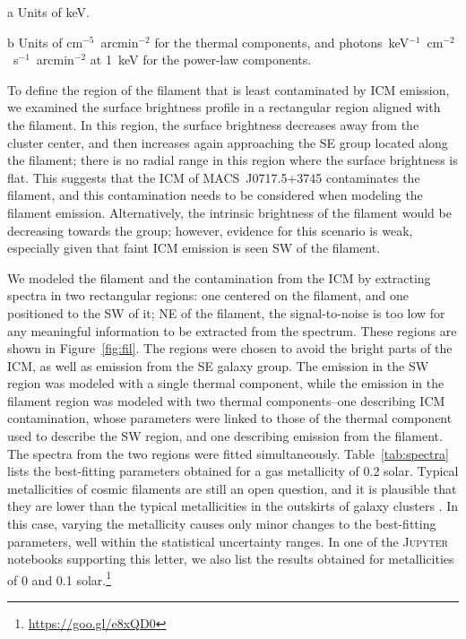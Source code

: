 \begin{table}
\begin{center}
\begin{threeparttable}
\begin{tabular}{l c c}
      \end{tabular}
      \begin{tablenotes}
              \item[a] Units of keV.
              \item[b] Units of cm$^{-5}$~arcmin$^{-2}$ for the thermal components, and photons~keV$^{-1}$~cm$^{-2}$~s$^{-1}$~arcmin$^{-2}$ at 1~keV for the power-law components.
      \end{tablenotes}
    \end{threeparttable}
  \end{center}
\end{table}

To define the region of the filament that is least contaminated by ICM emission, we examined the surface brightness profile in a rectangular region aligned with the filament. In this region, the surface brightness decreases away from the cluster center, and then increases again approaching the SE group located along the filament; there is no radial range in this region where the surface brightness is flat. This suggests that the ICM of MACS~J0717.5+3745 contaminates the filament, and this contamination needs to be considered when modeling the filament emission. Alternatively, the intrinsic brightness of the filament would be decreasing towards the group; however, evidence for this scenario is weak, especially given that faint ICM emission is seen SW of the filament.

We modeled the filament and the contamination from the ICM by extracting spectra in two rectangular regions: one centered on the filament, and one positioned to the SW of it; NE of the filament, the signal-to-noise is too low for any meaningful information to be extracted from the spectrum. These regions are shown in Figure~\ref{fig:fil}. The regions were chosen to avoid the bright parts of the ICM, as well as emission from the SE galaxy group. The emission in the SW region was modeled with a single thermal component, while the emission in the filament region was modeled with two thermal components--one describing ICM contamination, whose parameters were linked to those of the thermal component used to describe the SW region, and one describing emission from the filament. The spectra from the two regions were fitted simultaneously. Table~\ref{tab:spectra} lists the best-fitting parameters obtained for a gas metallicity of 0.2 solar. Typical metallicities of cosmic filaments are still an open question, and it is plausible that they are lower than the typical metallicities in the outskirts of galaxy clusters \citep[$\sim 0.2-0.3$; e.g.][]{Simionescu2015}. In this case, varying the metallicity causes only minor changes to the best-fitting parameters, well within the statistical uncertainty ranges. In one of the \textsc{Jupyter} notebooks supporting this letter, we also list the results obtained for metallicities of 0 and 0.1 solar.\footnote{\url{https://goo.gl/e8xQD0}}

